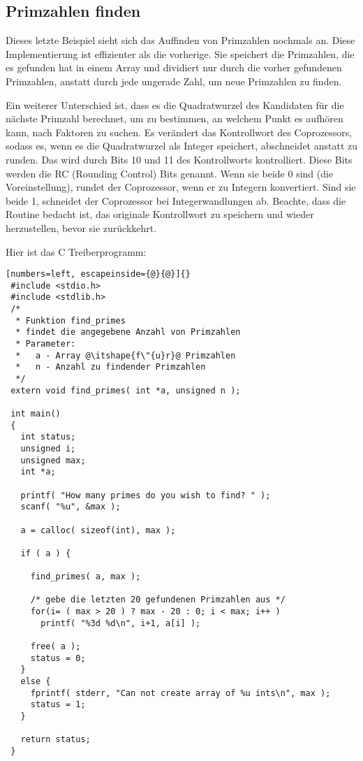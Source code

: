 \subsection{Primzahlen finden}

Dieses letzte Beispiel sieht sich das Auf\/finden von Primzahlen
nochmals an. Diese Implementierung ist effizienter als die
vorherige. Sie speichert die Primzahlen, die es gefunden hat in
einem Array und dividiert nur durch die vorher gefundenen
Primzahlen, anstatt durch jede ungerade Zahl, um neue Primzahlen zu
finden.

Ein weiterer Unterschied ist, dass es die Quadratwurzel des
Kandidaten f\"{u}r die n\"{a}chste Primzahl berechnet, um zu bestimmen, an
welchem Punkt es aufh\"{o}ren kann, nach Faktoren zu suchen. Es
ver\"{a}ndert das Kontrollwort des Coprozessors, sodass es, wenn es die
Quadratwurzel als Integer speichert, abschneidet anstatt zu runden.
Das wird durch Bits 10 und 11 des Kontrollworts kontrolliert. Diese
Bits werden die RC (Rounding Control)  Bits genannt. Wenn sie beide 0 sind (die Voreinstellung),
rundet der Coprozessor, wenn er zu Integern konvertiert. Sind sie
beide 1, schneidet der Coprozessor bei Integerwandlungen ab.
Beachte, dass die Routine bedacht ist, das originale Kontrollwort zu
speichern und wieder herzustellen, bevor sie zur\"{u}ckkehrt.

Hier ist das C Treiberprogramm:
\begin{lstlisting}[numbers=left, escapeinside={@}{@}]{}
 #include <stdio.h>
 #include <stdlib.h>
 /*
  * Funktion find_primes
  * findet die angegebene Anzahl von Primzahlen
  * Parameter:
  *   a - Array @\itshape{f\"{u}r}@ Primzahlen
  *   n - Anzahl zu findender Primzahlen
  */
 extern void find_primes( int *a, unsigned n );

 int main()
 {
   int status;
   unsigned i;
   unsigned max;
   int *a;

   printf( "How many primes do you wish to find? " );
   scanf( "%u", &max );

   a = calloc( sizeof(int), max );

   if ( a ) {

     find_primes( a, max );

     /* gebe die letzten 20 gefundenen Primzahlen aus */
     for(i= ( max > 20 ) ? max - 20 : 0; i < max; i++ )
       printf( "%3d %d\n", i+1, a[i] );

     free( a );
     status = 0;
   }
   else {
     fprintf( stderr, "Can not create array of %u ints\n", max );
     status = 1;
   }

   return status;
 }
\end{lstlisting}

